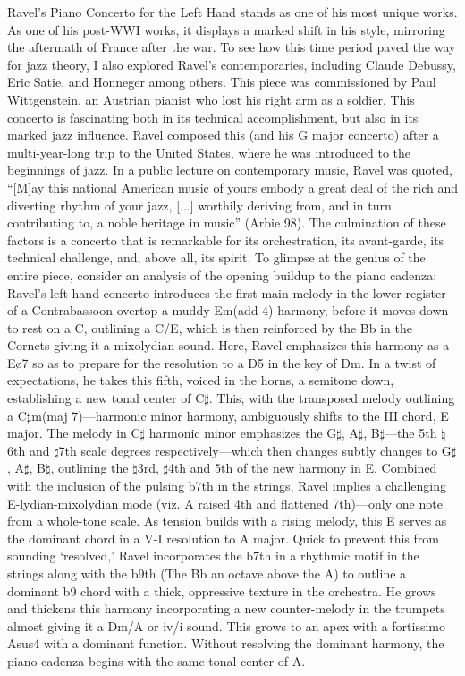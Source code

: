 \documentclass[11pt,a4paper]{article}
\begin{document}
Ravel’s Piano Concerto for the Left Hand stands as one of his most unique works. As one of his post-WWI works, it displays a marked shift in his style, mirroring the aftermath of France after the war. 
To see how this time period paved the way for jazz theory, I also explored Ravel's contemporaries, including Claude Debussy, Eric Satie, and Honneger among others. 
This piece was commissioned by Paul Wittgenstein, an Austrian pianist who lost his right arm as a soldier. This concerto is fascinating both in its technical accomplishment, but also in its marked jazz influence. 
Ravel composed this (and his G major concerto) after a multi-year-long trip to the United States, where he was introduced to the beginnings of jazz. 
In a public lecture on contemporary music, Ravel was quoted, “[M]ay this national American music of yours embody a great deal of the rich and diverting rhythm of your jazz, [...] worthily deriving from, and in turn contributing to, a noble heritage in music” (Arbie 98). The culmination of these factors is a concerto that is remarkable for its orchestration, its avant-garde, its technical challenge, and, above all, its spirit.
 To glimpse at the genius of the entire piece, consider an analysis of the opening buildup to the piano cadenza: Ravel’s left-hand concerto introduces the first main melody in the lower register of a Contrabassoon overtop a muddy Em(add 4) harmony, before it moves down to rest on a C, outlining a C/E, which is then reinforced by the Bb in the Cornets giving it a mixolydian sound. Here, Ravel emphasizes this harmony as a Eø7 so as to prepare for the resolution to a D5 in the key of Dm. In a twist of expectations, he takes this fifth, voiced in the horns, a semitone down, establishing a new tonal center of C$\sharp$. This, with the transposed melody outlining a C$\sharp$m(maj 7)—harmonic minor harmony, ambiguously shifts to the III chord, E major. The melody in C$\sharp$ harmonic minor emphasizes the G$\sharp$, A$\sharp$, B$\sharp$—the 5th $\natural$6th and $\natural$7th scale degrees respectively—which then changes subtly changes to G$\sharp$, A$\sharp$, B$\natural$, outlining the $\natural$3rd, $\sharp$4th and 5th of the new harmony in E. Combined with the inclusion of the pulsing b7th in the strings, Ravel implies a challenging E-lydian-mixolydian mode (viz. A raised 4th and flattened 7th)—only one note from a whole-tone scale. As tension builds with a rising melody, this E serves as the dominant chord in a V-I resolution to A major. Quick to prevent this from sounding ‘resolved,’ Ravel incorporates the b7th in a rhythmic motif in the strings along with the b9th (The Bb an octave above the A) to outline a dominant b9 chord with a thick, oppressive texture in the orchestra. He grows and thickens this harmony incorporating a new counter-melody in the trumpets almost giving it a Dm/A or iv/i sound. This grows to an apex with a fortissimo Asus4 with a dominant function. Without resolving the dominant harmony, the piano cadenza begins with the same tonal center of A.\autocite{ravel}
\end{document}
